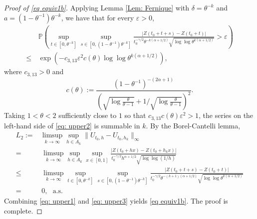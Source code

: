 \documentclass[11pt, reqno]{amsart}
\numberwithin{equation}{section}
\newcommand{\1}{{\bf 1}}
\newcommand{\2}{{\bf 2}}
\begin{document}
\begin{proof}[Proof of   \eqref{eq equiv1b}]
Applying  Lemma \ref{Lem: Fernique} with $\delta=\theta^{-k}$ and $a=(1-\theta^{-1})\theta^{-k}$, we have that for every $\varepsilon>0$,
\begin{equation}\label{eq: upper2}
\begin{split}
&\,\mathbb P\left(\sup_{t\in [0,\theta^{-k}]}\sup_{s\in [0,(1-\theta^{-1})\theta^{-k}]}
 \frac{|Z(t_0+t+s)-Z(t_0+t)|}{  {t_0^{-\gamma/2}} \theta^{-k(\alpha+1/2)}    \sqrt{\log\log \theta^{k(\alpha+1/2)}}}>\varepsilon\right)\\
\le &\,  \exp\left( - c_{3,13} \varepsilon^2 c(\theta)   \log\log \theta^{k(\alpha+1/2)}\right),
\end{split}
\end{equation}
where  $c_{3,13}>0$ and $$c(\theta):=\frac{ (1-\theta^{-1})^{- {(2\alpha+1)}}  }{\left(\sqrt{\log\frac{\theta}{\theta-1}}
+ 1/{\sqrt{\log\frac{\theta}{\theta-1}}}\right)^2}.$$
Taking  $1<\theta<2$  sufficiently  close to $1$ so that $c_{3,13}c(\theta)\varepsilon^2>1$,  the series on the left-hand side of \eqref{eq: upper2} is  summable in $k$. 
By the Borel-Cantelli lemma,
\begin{equation}\label{eq: upper3}
\begin{split}
L_2:=& \limsup_{k\rightarrow\infty}\sup_{h\in A_k} \|U_{t_0,h}-U_{t_0, h_k}\|_{\infty}\\
=&\,\limsup_{k\rightarrow\infty}\sup_{h\in A_k}\sup_{x\in [0,1]}\frac{|Z(t_0+hx)-Z(t_0+h_kx)|}{ {t_0^{-\gamma/2}}h^{\alpha+1/2}\sqrt{\log\log (1/h) }}\\
\le&\, \limsup_{k\rightarrow\infty}\sup_{t\in [0, \theta^{-k}]}\sup_{s\in [0,(1-\theta^{-1}) \theta^{-k}]}\frac{|Z(t_0+t+s)-
Z(t_0+t)|}{ {t_0^{-\gamma/2}}\theta^{-(k+1)(\alpha+1/2)} \sqrt{\log\log \theta^{ k(\alpha+1/2)}} }\\
= &\, 0, \ \ \ \text{a.s.}
\end{split}
\end{equation}
Combining \eqref{eq: upper1} and \eqref{eq: upper3} yields \eqref{eq equiv1b}.  The proof is complete. 
\end{proof}
\end{document}
